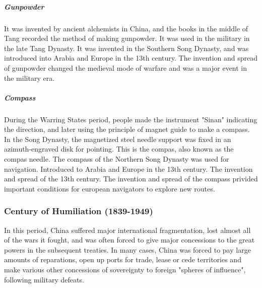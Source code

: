 \subparagraph{Gunpowder}
It was invented by ancient alchemists in China, and the books in the middle
of Tang recorded the method of making gunpowder. It was used in the military
in the late Tang Dynasty. It was invented in the Southern Song Dynasty, and
was introduced into Arabia and Europe in the 13th century. The invention and
spread of gunpowder changed the medieval mode of warfare and was a major
event in the military era.

\subparagraph{Compass}
During the Warring States period, people made the instrument "Sinan" indicating
the direction, and later using the principle of magnet guide to make a compass.
In the Song Dynasty, the magnetized steel needle support was fixed in an
azimuth-engraved disk for pointing. This is the compas, also known as the
compas needle. The compass of the Northern Song Dynasty was used for navigation.
Introduced to Arabia and Europe in the 13th century. The invention and spread
of the 13th century. The invention and spread of the compass privided important
conditions for european navigators to explore new routes.

\subsubsection{Century of Humiliation (1839-1949)}

In this period, China suffered major international fragmentation, lost almost
all of the wars it fought, and was often forced to give major concessions to
the great powers in the subsequent treaties. In many cases, China was forced
to pay large amounts of reparations, open up ports for trade, lease or cede
territories and make various other concessions of sovereignty to foreign
"spheres of influence", following military defeats.

